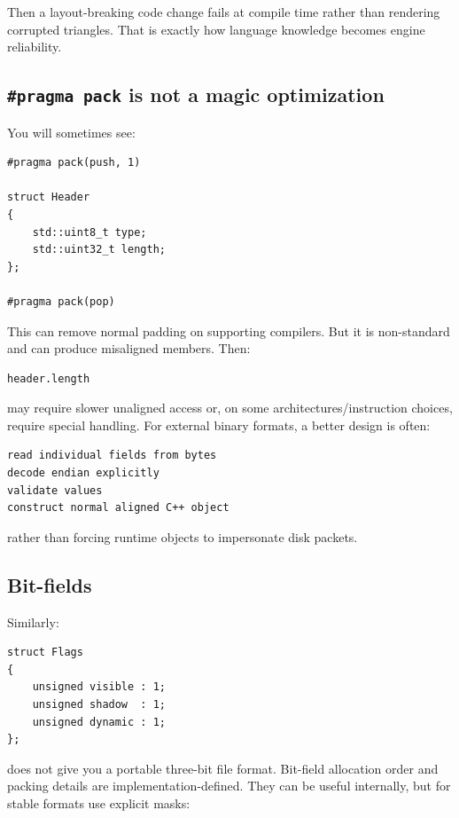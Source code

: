Then a layout-breaking code change fails at compile time rather than rendering corrupted triangles. That is exactly how language knowledge becomes engine reliability.

\subsection{\texorpdfstring{\texttt{\#pragma\ pack} is not a magic optimization}{\#pragma pack is not a magic optimization}}\label{01-foundations-i-ch003-pragma-pack-is-not-a-magic-optimization}

You will sometimes see:

\begin{verbatim}
#pragma pack(push, 1)

struct Header
{
    std::uint8_t type;
    std::uint32_t length;
};

#pragma pack(pop)
\end{verbatim}

This can remove normal padding on supporting compilers. But it is non-standard and can produce misaligned members. Then:

\begin{verbatim}
header.length
\end{verbatim}

may require slower unaligned access or, on some architectures/instruction choices, require special handling. For external binary formats, a better design is often:

\begin{verbatim}
read individual fields from bytes
decode endian explicitly
validate values
construct normal aligned C++ object
\end{verbatim}

rather than forcing runtime objects to impersonate disk packets.

\subsection{Bit-fields}\label{01-foundations-i-ch003-bit-fields}

Similarly:

\begin{verbatim}
struct Flags
{
    unsigned visible : 1;
    unsigned shadow  : 1;
    unsigned dynamic : 1;
};
\end{verbatim}

does not give you a portable three-bit file format. Bit-field allocation order and packing details are implementation-defined. They can be useful internally, but for stable formats use explicit masks:

